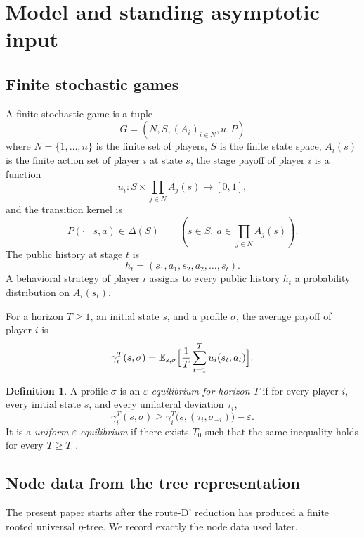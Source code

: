 \documentclass[12pt]{article}
\theoremstyle{definition}
\newtheorem{definition}[theorem]{Definition}
\newcommand{\eps}{\varepsilon}
\newcommand{\E}{\mathbb{E}}
\newcommand{\1}{\mathbf{1}}
\begin{document}
\section{Model and standing asymptotic input}
\label{sec:model}

\subsection{Finite stochastic games}

A finite stochastic game is a tuple
\[
G=(N,S,(A_i)_{i\in N},u,P)
\]
where $N=\{1,\dots,n\}$ is the finite set of players, $S$ is the finite state
space, $A_i(s)$ is the finite action set of player $i$ at state $s$, the stage
payoff of player $i$ is a function
\[
u_i:S\times \prod_{j\in N}A_j(s)\to [0,1],
\]
and the transition kernel is
\[
P(\cdot\mid s,a)\in \Delta(S)
\qquad (s\in S,\ a\in \prod_{j\in N}A_j(s)).
\]
The public history at stage $t$ is
\[
h_t=(s_1,a_1,s_2,a_2,\dots,s_t).
\]
A behavioral strategy of player $i$ assigns to every public history $h_t$ a
probability distribution on $A_i(s_t)$.

For a horizon $T\ge 1$, an initial state $s$, and a profile $\sigma$, the average
payoff of player $i$ is
\[
\gamma_i^T(s,\sigma)
=
\E_{s,\sigma}\Bigl[\frac1T\sum_{t=1}^T u_i(s_t,a_t)\Bigr].
\]

\begin{definition}
A profile $\sigma$ is an \emph{$\eps$-equilibrium for horizon $T$} if for every
player $i$, every initial state $s$, and every unilateral deviation $\tau_i$,
\[
\gamma_i^T(s,\sigma)
\ge
\gamma_i^T\bigl(s,(\tau_i,\sigma_{-i})\bigr)-\eps.
\]
It is a \emph{uniform $\eps$-equilibrium} if there exists $T_0$ such that the same
inequality holds for every $T\ge T_0$.
\end{definition}

\subsection{Node data from the tree representation}

The present paper starts after the route-D' reduction has produced a finite rooted
universal $\eta$-tree. We record exactly the node data used later.
\end{document}
